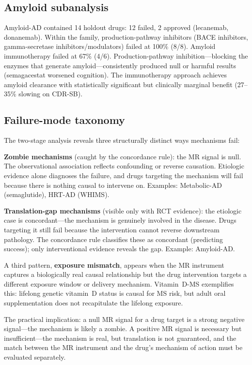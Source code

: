 \documentclass[11pt]{article}
\begin{document}
\subsection{Amyloid subanalysis}

Amyloid-AD contained 14 holdout drugs: 12 failed, 2 approved (lecanemab, donanemab). Within the family, production-pathway inhibitors (BACE inhibitors, gamma-secretase inhibitors/modulators) failed at 100\% (8/8). Amyloid immunotherapy failed at 67\% (4/6). Production-pathway inhibition---blocking the enzymes that generate amyloid---consistently produced null or harmful results (semagacestat worsened cognition). The immunotherapy approach achieves amyloid clearance with statistically significant but clinically marginal benefit (27--35\% slowing on CDR-SB).

\subsection{Failure-mode taxonomy}
\label{sec:two_modes}

The two-stage analysis reveals three structurally distinct ways mechanisms fail:

\textbf{Zombie mechanisms} (caught by the concordance rule): the MR signal is null. The observational association reflects confounding or reverse causation. Etiologic evidence alone diagnoses the failure, and drugs targeting the mechanism will fail because there is nothing causal to intervene on. Examples: Metabolic-AD (semaglutide), HRT-AD (WHIMS).

\textbf{Translation-gap mechanisms} (visible only with RCT evidence): the etiologic case is concordant---the mechanism is genuinely involved in the disease. Drugs targeting it still fail because the intervention cannot reverse downstream pathology. The concordance rule classifies these as concordant (predicting success); only interventional evidence reveals the gap. Example: Amyloid-AD.

A third pattern, \textbf{exposure mismatch}, appears when the MR instrument captures a biologically real causal relationship but the drug intervention targets a different exposure window or delivery mechanism. Vitamin~D-MS exemplifies this: lifelong genetic vitamin~D status is causal for MS risk, but adult oral supplementation does not recapitulate the lifelong exposure.

The practical implication: a null MR signal for a drug target is a strong negative signal---the mechanism is likely a zombie. A positive MR signal is necessary but insufficient---the mechanism is real, but translation is not guaranteed, and the match between the MR instrument and the drug's mechanism of action must be evaluated separately.
\end{document}
